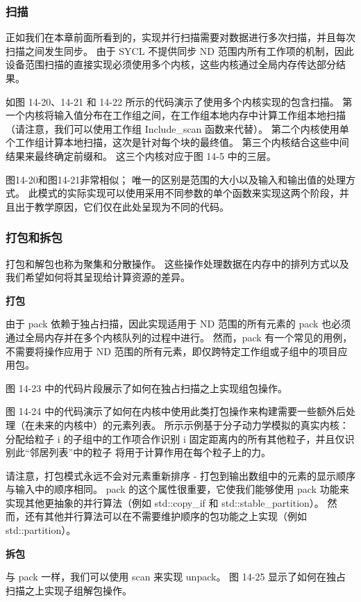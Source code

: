 \subsubsection{扫描}
正如我们在本章前面所看到的，实现并行扫描需要对数据进行多次扫描，并且每次扫描之间发生同步。 由于 SYCL 不提供同步 ND 范围内所有工作项的机制，因此设备范围扫描的直接实现必须使用多个内核，这些内核通过全局内存传达部分结果。

如图 14-20、14-21 和 14-22 所示的代码演示了使用多个内核实现的包含扫描。 第一个内核将输入值分布在工作组之间，在工作组本地内存中计算工作组本地扫描（请注意，我们可以使用工作组 Include\_scan 函数来代替）。 第二个内核使用单个工作组计算本地扫描，这次是针对每个块的最终值。 第三个内核结合这些中间结果来最终确定前缀和。 这三个内核对应于图 14-5 中的三层。

图14-20和图14-21非常相似； 唯一的区别是范围的大小以及输入和输出值的处理方式。 此模式的实际实现可以使用采用不同参数的单个函数来实现这两个阶段，并且出于教学原因，它们仅在此处呈现为不同的代码。

\subsubsection{打包和拆包}
打包和解包也称为聚集和分散操作。 这些操作处理数据在内存中的排列方式以及我们希望如何将其呈现给计算资源的差异。

\textbf{打包}

由于 pack 依赖于独占扫描，因此实现适用于 ND 范围的所有元素的 pack 也必须通过全局内存并在多个内核队列的过程中进行。 然而，pack 有一个常见的用例，不需要将操作应用于 ND 范围的所有元素，即仅跨特定工作组或子组中的项目应用包。

图 14-23 中的代码片段展示了如何在独占扫描之上实现组包操作。

图 14-24 中的代码演示了如何在内核中使用此类打包操作来构建需要一些额外后处理（在未来的内核中）的元素列表。 所示示例基于分子动力学模拟的真实内核：分配给粒子 i 的子组中的工作项合作识别 i 固定距离内的所有其他粒子，并且仅识别此“邻居列表”中的粒子 将用于计算作用在每个粒子上的力。

请注意，打包模式永远不会对元素重新排序 - 打包到输出数组中的元素的显示顺序与输入中的顺序相同。 pack 的这个属性很重要，它使我们能够使用 pack 功能来实现其他更抽象的并行算法（例如 std::copy\_if 和 std::stable\_partition）。 然而，还有其他并行算法可以在不需要维护顺序的包功能之上实现（例如 std::partition）。

\textbf{拆包}

与 pack 一样，我们可以使用 scan 来实现 unpack。 图 14-25 显示了如何在独占扫描之上实现子组解包操作。

